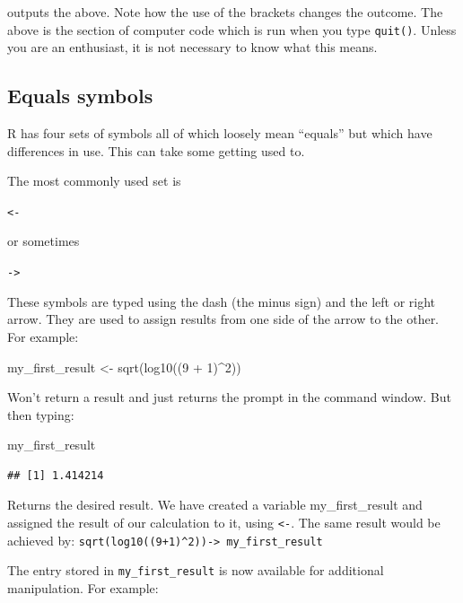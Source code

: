 \documentclass[
]{book}
\newenvironment{Shaded}{\begin{snugshade}}{\end{snugshade}}
\newcommand{\DecValTok}[1]{\textcolor[rgb]{0.00,0.00,0.81}{#1}}
\newcommand{\FunctionTok}[1]{\textcolor[rgb]{0.00,0.00,0.00}{#1}}
\newcommand{\NormalTok}[1]{#1}
\newcommand{\OtherTok}[1]{\textcolor[rgb]{0.56,0.35,0.01}{#1}}
\newcommand{\SpecialCharTok}[1]{\textcolor[rgb]{0.00,0.00,0.00}{#1}}
\begin{document}
outputs the above. Note how the use of the brackets changes the outcome. The above is the section of computer code which is run when you type \texttt{quit()}. Unless you are an enthusiast, it is not necessary to know what this means.

\hypertarget{equals-symbols}{%
\subsection{Equals symbols}\label{equals-symbols}}

R has four sets of symbols all of which loosely mean ``equals'' but which have differences in use. This can take some getting used to.

The most commonly used set is

\texttt{\textless{}-}

or sometimes

\texttt{-\textgreater{}}

These symbols are typed using the dash (the minus sign) and the left or right arrow. They are used to assign results from one side of the arrow to the other. For example:

\begin{Shaded}
\begin{Highlighting}[]
\NormalTok{my\_first\_result }\OtherTok{\textless{}{-}} \FunctionTok{sqrt}\NormalTok{(}\FunctionTok{log10}\NormalTok{((}\DecValTok{9} \SpecialCharTok{+} \DecValTok{1}\NormalTok{)}\SpecialCharTok{\^{}}\DecValTok{2}\NormalTok{))}
\end{Highlighting}
\end{Shaded}

Won't return a result and just returns the prompt in the command window. But then typing:

\begin{Shaded}
\begin{Highlighting}[]
\NormalTok{my\_first\_result}
\end{Highlighting}
\end{Shaded}

\begin{verbatim}
## [1] 1.414214
\end{verbatim}

Returns the desired result. We have created a variable my\_first\_result and assigned the result of our calculation to it, using \texttt{\textless{}-}. The same result would be achieved by: \texttt{sqrt(log10((9+1)\^{}2))-\textgreater{}\ my\_first\_result}

The entry stored in \texttt{my\_first\_result} is now available for additional manipulation. For example:
\end{document}
